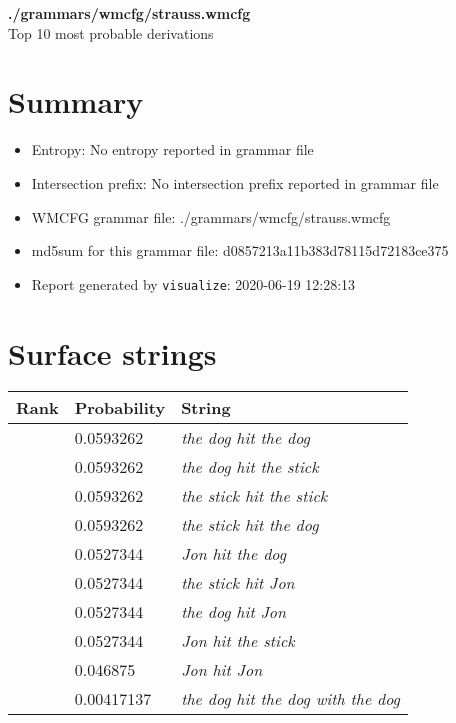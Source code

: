\documentclass[11pt]{article}
\begin{document}
\begin{center}
{\huge \textbf{./grammars/wmcfg/strauss.wmcfg}} \\[0.5em]
{\normalsize Top 10 most probable derivations}
\end{center}

\section{Summary}
\begin{itemize}
	\item Entropy: No entropy reported in grammar file
	\item Intersection prefix: No intersection prefix reported in grammar file
	\item WMCFG grammar file: ./grammars/wmcfg/strauss.wmcfg
	\item md5sum for this grammar file: d0857213a11b383d78115d72183ce375
	\item Report generated by \texttt{visualize}: 2020-06-19 12:28:13
\end{itemize}

\section{Surface strings}
\hspace{1em}
\renewcommand{\arraystretch}{1.15}
\newcommand\rownumber{\stepcounter{rownumber}\arabic{rownumber}}
\begin{tabular}{l l l}
	\hline
	 Rank & Probability & String \\
	\hline
\rownumber & 0.0593262 & \textit{the dog hit the dog} \\
\rownumber & 0.0593262 & \textit{the dog hit the stick} \\
\rownumber & 0.0593262 & \textit{the stick hit the stick} \\
\rownumber & 0.0593262 & \textit{the stick hit the dog} \\
\rownumber & 0.0527344 & \textit{Jon hit the dog} \\
\rownumber & 0.0527344 & \textit{the stick hit Jon} \\
\rownumber & 0.0527344 & \textit{the dog hit Jon} \\
\rownumber & 0.0527344 & \textit{Jon hit the stick} \\
\rownumber & 0.046875 & \textit{Jon hit Jon} \\
\rownumber & 0.00417137 & \textit{the dog hit the dog with the dog} \\
	\hline
\end{tabular}
\pagebreak
\end{document}
